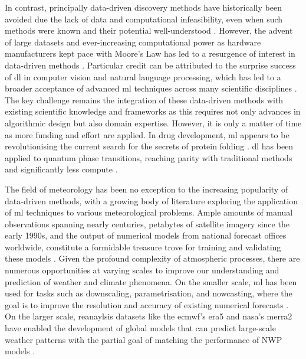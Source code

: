In contrast, principally data-driven discovery methods have historically been avoided due the lack of data and computational infeasibility, even when such methods were known and their potential well-understood \citep{Rosenblatt1957,Rumelhart1986}. However, the advent of large datasets and ever-increasing computational power as hardware manufacturers kept pace with Moore's Law  has led to a resurgence of interest in data-driven methods \citep{Haber2025}. Particular credit can be attributed to the surprise success of \acrfull{dl} in computer vision and natural language processing, which has led to a broader acceptance of advanced \acrfull{ml} techniques across many scientific disciplines \citep{Haber2025,Krizhevsky2017}. The key challenge remains the integration of these data-driven methods with existing scientific knowledge and frameworks as this requires not only advances in algorithmic design but also domain expertise. However, it is only a matter of time as more funding and effort are applied. In drug development, \acrfull{ml} appears to be revolutionising the current search for the secrets of protein folding \citep{Jumper2021}. \acrshort{dl} has been applied to quantum phase transitions, reaching parity with traditional methods and significantly less compute \citep{Huembeli2018}.

The field of meteorology has been no exception to the increasing popularity of data-driven methods, with a growing body of literature exploring the application of \acrshort{ml} techniques to various meteorological problems. Ample amounts of manual observations spanning nearly centuries, petabytes of satellite imagery since the early 1990s, and the output of numerical models from national forecast offices worldwide, constitute a formidable treasure trove for training and validating these models \citep{Bracco2024,Waqas2024,Zhang2025}. Given the profound complexity of atmospheric processes, there are numerous opportunities at varying scales to improve our understanding and prediction of weather and climate phenomena. On the smaller scale, \acrshort{ml} has been used for tasks such as downscaling, parametrisation, and nowcasting, where the goal is to improve the resolution and accuracy of existing numerical forecasts \citep{Blunn2024,Zhang2023}. On the larger scale, reanaylsis datasets like the \acrfull{ecmwf}'s \acrfull{era5} and \acrfull{nasa}'s \acrfull{merra2} have enabled the development of global models that can predict large-scale weather patterns with the partial goal of matching the performance of NWP models \citep{Bracco2024,Gelaro2017,Hersbach2020,Zhang2025}.


